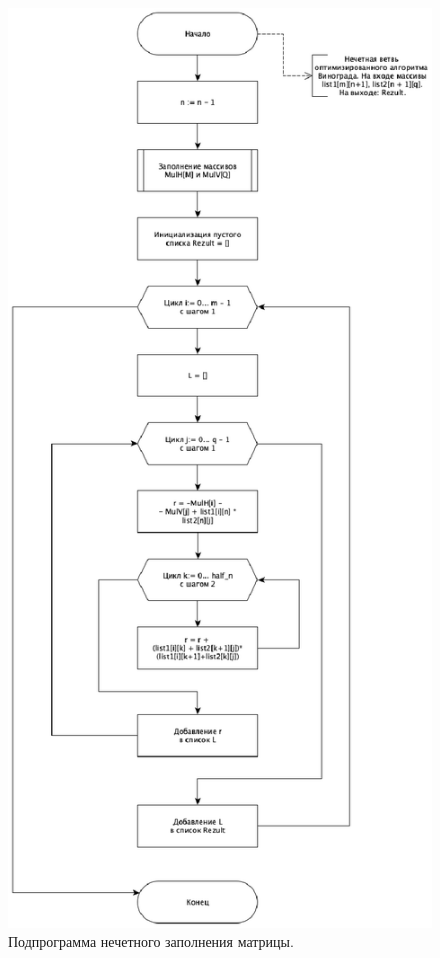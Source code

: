 \documentclass[12pt]{report}
\begin{document}
\newpage

\begin{figure}[H]
	\centering
	\includegraphics[width=0.75\linewidth]{uneven}
	\caption{Подпрограмма нечетного заполнения матрицы.}
	\label{ris:image8}
\end{figure}

\newpage
\end{document}
